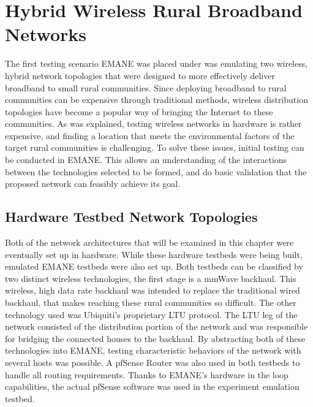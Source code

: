 \chapter{Hybrid Wireless Rural Broadband Networks}
\label{chapter3}
The first testing scenario EMANE was placed under was emulating two wireless, hybrid network topologies that were designed to more effectively deliver broadband to small rural communities.
Since deploying broadband to rural communities can be expensive through traditional methods, wireless distribution topologies have become a popular way of bringing the Internet to these communities.
As was explained, testing wireless networks in hardware is rather expensive, and finding a location that meets the environmental factors of the target rural communities is challenging.
To solve these issues, initial testing can be conducted in EMANE. This allows an understanding of the interactions between the technologies selected to be formed, and do basic validation that the proposed network can feasibly achieve its goal.

\section{Hardware Testbed Network Topologies}
Both of the network architectures that will be examined in this chapter were eventually set up in hardware.
While these hardware testbeds were being built, emulated EMANE testbeds were also set up.
Both testbeds can be classified by two distinct wireless technologies, the first stage is a mmWave backhaul.
This wireless, high data rate backhaul was intended to replace the traditional wired backhaul, that makes reaching these rural communities so difficult.
The other technology used was Ubiquiti's proprietary LTU protocol.
The LTU leg of the network consisted of the distribution portion of the network and was responsible for bridging the connected houses to the backhaul.
By abstracting both of these technologies into EMANE, testing characteristic behaviors of the network with several hosts was possible.
A pfSense Router was also used in both testbeds to handle all routing requirements.
Thanks to EMANE's hardware in the loop capabilities, the actual pfSense software was used in the experiment emulation testbed.

